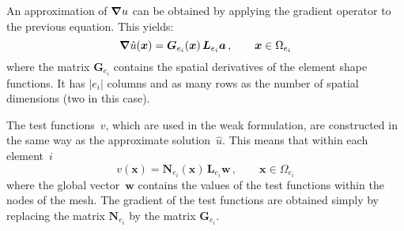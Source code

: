 An approximation of $\mbox{\boldmath $\nabla$} u$ can be obtained by applying the
gradient operator to the previous equation. This yields:
\begin{equation}
  \mbox{\boldmath $\nabla$} \hat{u}(\mbox{\boldmath $x$}) = \mbox{\boldmath $G$}_{e_i}(\mbox{\boldmath $x$}) \, \mbox{\boldmath $L$}_{e_i} \mbox{\boldmath $a$}
  \, , \qquad \mbox{\boldmath $x$} \in \Omega_{e_i}
  \label{eq:poisson-gradient-approximation}
\end{equation}
where the matrix $\bm{G}_{e_i}$ contains the spatial derivatives of the
element shape functions. It has $|e_i|$ columns and as many rows as
the number of spatial dimensions (two in this case).

The test functions~$v$, which are used in the weak formulation, are
constructed in the same way as the approximate solution~$\hat{u}$.
This means that within each element~$i$
\begin{displaymath}
  v(\bm{x}) = \bm{N}_{e_i}(\bm{x}) \, \bm{L}_{e_i} \bm{w} \, ,
  \qquad \bm{x} \in \Omega_{e_i}
\end{displaymath}
where the global vector~$\bm{w}$ contains the values of the test
functions within the nodes of the mesh. The gradient of the test
functions are obtained simply by replacing the matrix $\bm{N}_{e_i}$
by the matrix $\bm{G}_{e_i}$.




